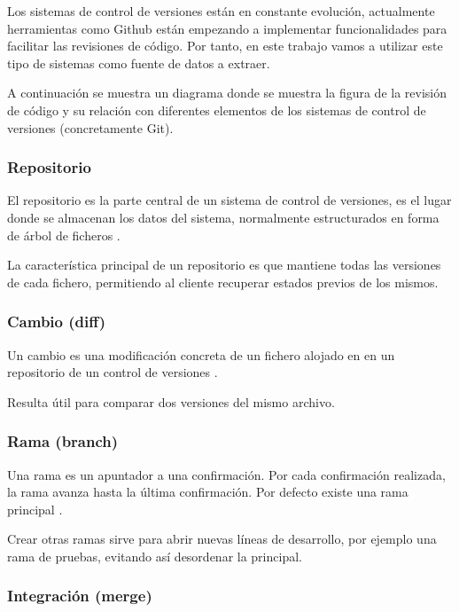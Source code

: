 Los sistemas de control de versiones están en constante evolución, actualmente herramientas como Github están empezando a implementar funcionalidades para facilitar  las revisiones de código. Por tanto, en este trabajo vamos a utilizar este tipo de sistemas como fuente de datos a extraer.

A continuación se muestra un diagrama donde se muestra la figura de la revisión de código y su relación con diferentes elementos de los sistemas de control de versiones (concretamente Git).


\subsubsection{Repositorio}

El repositorio es la parte central de un sistema de control de versiones, es el lugar donde se almacenan los datos del sistema, normalmente estructurados en forma de árbol de ficheros \cite{Pilato:2008:VCS:1435405}.

La característica principal de un repositorio es que mantiene todas las versiones de cada fichero, permitiendo al cliente recuperar estados previos de los mismos.

\subsubsection{Cambio (diff)}

Un cambio es una modificación concreta de un fichero alojado en en un repositorio de un control de versiones \cite{wiki:002}.

Resulta útil para comparar dos versiones del mismo archivo.

\subsubsection{Rama (branch)}

Una rama es un apuntador a una confirmación. Por cada confirmación realizada, la rama avanza hasta la última confirmación. Por defecto existe una rama principal \cite{Chacon:2014:PG:2695634}. 

Crear otras ramas sirve para abrir nuevas líneas de desarrollo, por ejemplo una rama de pruebas, evitando así desordenar la principal.

\subsubsection{Integración (merge)}

